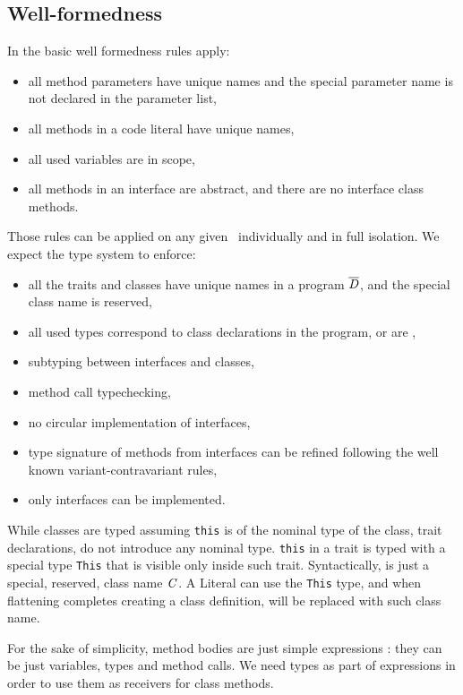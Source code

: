 \subsection{Well-formedness}
In \name the basic well formedness rules apply:
\begin{itemize}
\item all method parameters have unique names and the special parameter name \Q@this@ is not declared
 in the parameter list,
\item all methods in a code literal have unique names,
\item all used variables are in scope,
\item all methods in an interface are abstract, and there are no interface class methods.
\end{itemize}
Those rules can be applied on any given \mL~individually and in full isolation.
We expect the type system to enforce: 
\begin{itemize}
\item all the traits and classes have unique names in a program $\overline{\mathit{D}}$, and the special class name
\Q@This@ is reserved,
\item all used types correspond to class declarations in the program, or are \Q@This@, 
\item subtyping between interfaces and classes,
\item method call typechecking,
\item no circular implementation of interfaces,
\item type signature of methods from interfaces can be refined following the well known variant-contravariant rules,
\item only interfaces can be implemented.
\end{itemize}
While classes are typed assuming \lstinline{this} is of the nominal type of the
class, trait declarations, do not introduce any nominal type.  \lstinline{this}
in a trait is typed with a special type \lstinline{This} that is visible only
inside such trait. Syntactically, \Q@This@ is just a special, reserved, class name $\mathit{C}$.
A Literal can use the \lstinline{This} type,
and when flattening completes creating a class definition, \Q@This@ will be replaced with such class name.

For the sake of simplicity, method bodies are just simple expressions
\me: they can be just variables, types and method calls. We need types as part of expressions in order to use them as receivers for class methods.

